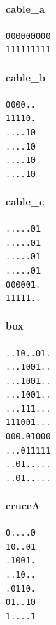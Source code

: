 \noindent\begin{minipage}[t]{\columnwidth}
\paragraph{cable\_a}
\begin{verbatim}
000000000
111111111
\end{verbatim}
\end{minipage}
\par\vspace{8pt}
\noindent\begin{minipage}[t]{\columnwidth}
\paragraph{cable\_b}
\begin{verbatim}
0000..
11110.
....10
....10
....10
....10
\end{verbatim}
\end{minipage}
\par\vspace{8pt}
\noindent\begin{minipage}[t]{\columnwidth}
\paragraph{cable\_c}
\begin{verbatim}
.....01
.....01
.....01
.....01
000001.
11111..
\end{verbatim}
\end{minipage}
\par\vspace{8pt}
\noindent\begin{minipage}[t]{\columnwidth}
\paragraph{box}
\begin{verbatim}
..10..01.
...1001..
...1001..
...1001..
...111...
111001...
000.01000
...011111
..01.....
..01.....
\end{verbatim}
\end{minipage}
\par\vspace{8pt}
\noindent\begin{minipage}[t]{\columnwidth}
\paragraph{cruceA}
\begin{verbatim}
0....0
10..01
.1001.
..10..
.0110.
01..10
1....1
\end{verbatim}
\end{minipage}
